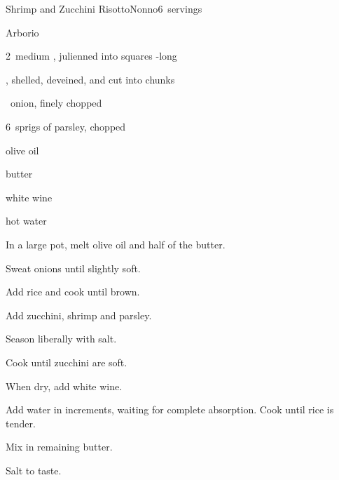 \begin{recipe}{Shrimp and Zucchini Risotto}{Nonno}{6~servings}

\begin{ingredients}
\item {} Arborio 
\item 2~medium , julienned into \inch{\quarter} squares -long
\item {} , shelled, deveined, and cut into chunks
\item \half{}~onion, finely chopped
\item 6~sprigs of parsley, chopped
\item {} olive oil
\item {} butter
\item \C{\half} white wine
\item hot water
\end{ingredients}

\begin{directions}
\item In a large pot, melt olive oil and half of the butter.
\item Sweat onions until slightly soft.
\item Add rice and cook until brown.
\item Add zucchini, shrimp and parsley.
\item Season liberally with salt.
\item Cook until zucchini are soft.
\item When dry, add white wine.
\item Add water in \C{\half} increments, waiting for complete absorption. Cook until rice is tender.
\item Mix in remaining butter.
\item Salt to taste.
\end{directions}

\end{recipe}
